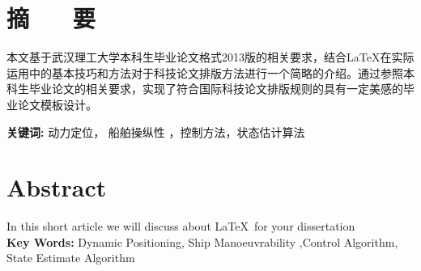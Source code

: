 \section*{ \centering 摘 ~~ 要}

\vskip0.5cm
本文基于武汉理工大学本科生毕业论文格式2013版的相关要求，结合\LaTeX 在实际运用中的基本技巧和方法对于科技论文排版方法进行一个简略的介绍。通过参照本科生毕业论文的相关要求，实现了符合国际科技论文排版规则的具有一定美感的毕业论文模板设计。 


\textbf{ 关键词:}  动力定位， 船舶操纵性 ，控制方法，状态估计算法

\clearpage
\section*{ \centering \textbf{Abstract} }

In this short article we will discuss about \LaTeX\,  for your dissertation \\

\textbf{ Key Words:} Dynamic Positioning, Ship Manoeuvrability ,Control Algorithm, State Estimate Algorithm




